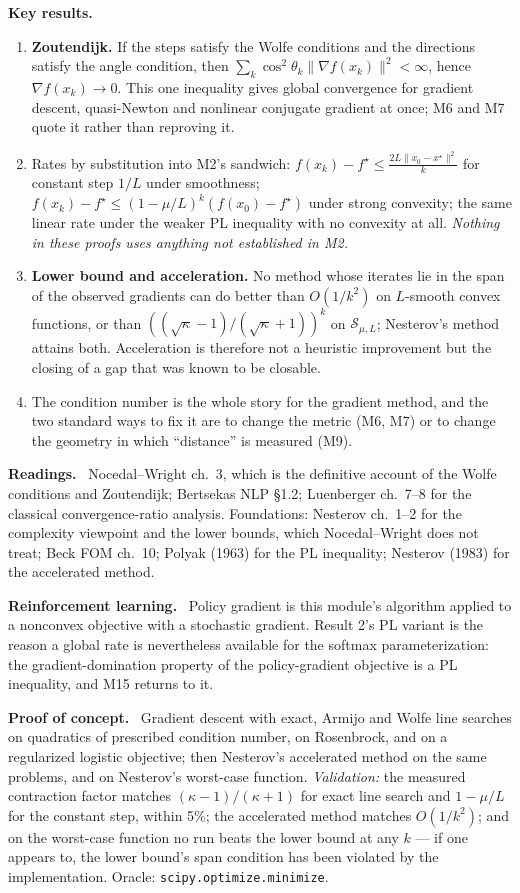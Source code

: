 \documentclass[11pt,a4paper]{article}
\newcommand{\mpart}[1]{\smallskip\noindent\textbf{#1}\ \ignorespaces}
\begin{document}
\mpart{Key results.}
\begin{enumerate}
\item \textbf{Zoutendijk.} If the steps satisfy the Wolfe conditions and the directions
satisfy the angle condition, then $\sum_k \cos^2\theta_k\|\nabla f(x_k)\|^2 < \infty$, hence
$\nabla f(x_k)\to0$. This one inequality gives global convergence for gradient descent,
quasi-Newton and nonlinear conjugate gradient at once; M6 and M7 quote it rather than
reproving it.
\item Rates by substitution into M2's sandwich: $f(x_k)-f^\star \le \tfrac{2L\|x_0-x^\star\|^2}{k}$
for constant step $1/L$ under smoothness; $f(x_k)-f^\star \le (1-\mu/L)^k(f(x_0)-f^\star)$
under strong convexity; the same linear rate under the weaker PL inequality with no convexity
at all. \emph{Nothing in these proofs uses anything not established in M2.}
\item \textbf{Lower bound and acceleration.} No method whose iterates lie in the span of the
observed gradients can do better than $O(1/k^2)$ on $L$-smooth convex functions, or than
$((\sqrt\kappa-1)/(\sqrt\kappa+1))^k$ on $\mathcal{S}_{\mu,L}$; Nesterov's method attains
both. Acceleration is therefore not a heuristic improvement but the closing of a gap that was
known to be closable.
\item The condition number is the whole story for the gradient method, and the two standard
ways to fix it are to change the metric (M6, M7) or to change the geometry in which
``distance'' is measured (M9).
\end{enumerate}

\mpart{Readings.} Nocedal--Wright ch.~3, which is the definitive account of the Wolfe
conditions and Zoutendijk; Bertsekas NLP \S 1.2; Luenberger ch.~7--8 for the classical
convergence-ratio analysis. Foundations: Nesterov ch.~1--2 for the complexity viewpoint and
the lower bounds, which Nocedal--Wright does not treat; Beck FOM ch.~10;
Polyak (1963) for the PL inequality; Nesterov (1983) for the accelerated method.

\mpart{Reinforcement learning.} Policy gradient is this module's algorithm applied to a
nonconvex objective with a stochastic gradient. Result 2's PL variant is the reason a global
rate is nevertheless available for the softmax parameterization: the gradient-domination
property of the policy-gradient objective is a PL inequality, and M15 returns to it.

\mpart{Proof of concept.} Gradient descent with exact, Armijo and Wolfe line searches on
quadratics of prescribed condition number, on Rosenbrock, and on a regularized logistic
objective; then Nesterov's accelerated method on the same problems, and on Nesterov's
worst-case function. \emph{Validation:} the measured contraction factor matches
$(\kappa-1)/(\kappa+1)$ for exact line search and $1-\mu/L$ for the constant step, within 5\%;
the accelerated method matches $O(1/k^2)$; and on the worst-case function no run beats the
lower bound at any $k$ --- if one appears to, the lower bound's span condition has been
violated by the implementation. Oracle: \texttt{scipy.optimize.minimize}.
\end{document}

